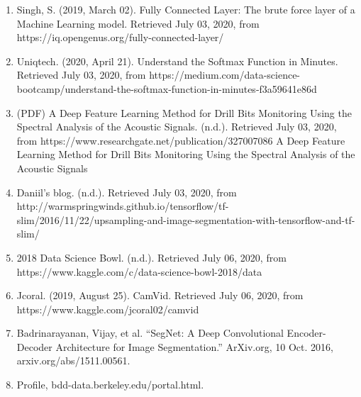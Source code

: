 \documentclass{IEEEtran}
\begin{document}
\begin{enumerate}
\item Singh, S. (2019, March 02). Fully Connected Layer: The brute force layer of a Machine Learning model. Retrieved July 03, 2020, from https://iq.opengenus.org/fully-connected-layer/

\item Uniqtech. (2020, April 21). Understand the Softmax Function in Minutes. Retrieved July 03, 2020, from https://medium.com/data-science-bootcamp/understand-the-softmax-function-in-minutes-f3a59641e86d

\item (PDF) A Deep Feature Learning Method for Drill Bits Monitoring Using the Spectral Analysis of the Acoustic Signals. (n.d.). Retrieved July 03, 2020, from https://www.researchgate.net/publication/327007086 A Deep Feature Learning Method for Drill Bits Monitoring Using the Spectral Analysis of the Acoustic Signals

\item Daniil's blog. (n.d.). Retrieved July 03, 2020, from http://warmspringwinds.github.io/tensorflow/tf-slim/2016/11/22/upsampling-and-image-segmentation-with-tensorflow-and-tf-slim/

\item 2018 Data Science Bowl. (n.d.). Retrieved July 06, 2020, from https://www.kaggle.com/c/data-science-bowl-2018/data

\item Jcoral. (2019, August 25). CamVid. Retrieved July 06, 2020, from https://www.kaggle.com/jcoral02/camvid

\item Badrinarayanan, Vijay, et al. “SegNet: A Deep Convolutional Encoder-Decoder Architecture for Image Segmentation.” ArXiv.org, 10 Oct. 2016, arxiv.org/abs/1511.00561.

\item Profile, bdd-data.berkeley.edu/portal.html.
\end{enumerate}
\end{document}
